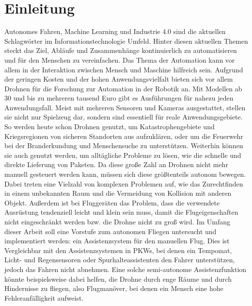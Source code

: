 

\pagestyle{plain}
\chapter{Einleitung}
\label{cha:Introduction}
Autonomes Fahren, Machine Learning und Industrie 4.0 sind die aktuellen Schlagwörter im Informationstechnologie Umfeld. Hinter diesen aktuellen Themen steckt das Ziel, Abläufe und Zusammenhänge kontinuierlich zu automatisieren und für den Menschen zu vereinfachen. Das Thema der Automation kann vor allem in der Interaktion zwischen Mensch und Maschine hilfreich sein. Aufgrund der geringen Kosten und der hohen Anwendungsvielfalt bieten sich vor allem Drohnen für die Forschung zur Automation in der Robotik an. \newline
Mit Modellen ab 30 und bis zu mehreren tausend Euro gibt es Ausführungen für nahezu jeden Anwendungsfall. Meist mit mehreren Sensoren und Kameras ausgestattet, stellen sie nicht nur Spielzeug dar, sondern sind essentiell für reale Anwendungsgebiete. \newline
So werden heute schon Drohnen genutzt, um Katastrophengebiete und Kriegsregionen von sicheren Standorten aus aufzuklären, oder um die Feuerwehr bei der Branderkundung und Menschensuche zu unterstützen. \newline
Weiterhin können sie auch genutzt werden, um alltägliche Probleme zu lösen, wie die schnelle und direkte Lieferung von Paketen. \newline
Da diese große Zahl an Drohnen nicht mehr manuell gesteuert werden kann, müssen sich diese größtenteils autonom bewegen. Dabei treten eine Vielzahl von komplexen Problemen auf, wie das Zurechtfinden in einem unbekannten Raum und die Vermeidung von Kollision mit anderen Objekt. \newline
Außerdem ist bei Fluggeräten das Problem, dass die verwendete Ausrüstung tendenziell leicht und klein sein muss, damit die Flugeigenschaften nicht eingeschränkt werden bzw. die Drohne nicht zu groß wird. \newline
Im Umfang dieser Arbeit soll eine Vorstufe zum autonomen Fliegen untersucht und implementiert werden: ein Assistenzsystem für den manuellen Flug. Dies ist Vergleichbar mit den Assistenzsystemen in PKWs, bei denen ein Tempomat, Licht- und Regensensoren oder Spurhalteassistenten den Fahrer unterstützen, jedoch das Fahren nicht abnehmen. \newline
Eine solche semi-autonome Assistenzfunktion könnte beispielsweise dabei helfen, die Drohne durch enge Räume und durch Hindernisse zu fliegen, also Flugmanöver, bei denen ein Mensch eine hohe Fehleranfälligkeit aufweist. \newline


